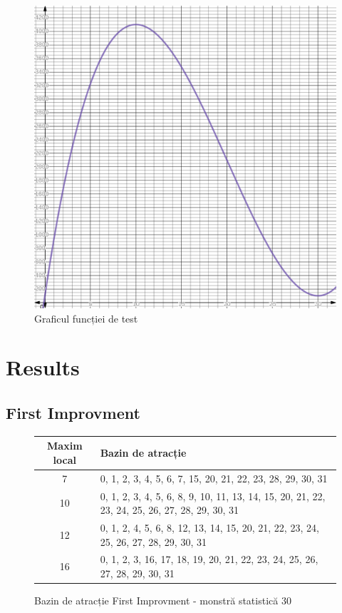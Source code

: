 \documentclass{article}
\begin{document}
\begin{figure}[!h]
  \includegraphics[width=\textwidth,height=\textheight,keepaspectratio]{desmos-graph.png}
  \caption{Graficul funcției de test}
\end{figure}

\section{Results}
\subsection{First Improvment}

\begin{figure}[!h]
\begin{tabular}{||c|||l||}
  \hline
  Maxim local & Bazin de atracție \\ \hline \hline
  7 & 0, 1, 2, 3, 4, 5, 6, 7, 15, 20, 21, 22, 23, 28, 29, 30, 31\\ \hline
  10 & 0, 1, 2, 3, 4, 5, 6, 8, 9, 10, 11, 13, 14, 15, 20, 21, 22, 23, 24, 25, 26, 27, 28, 29, 30, 31 \\ \hline
  12 & 0, 1, 2, 4, 5, 6, 8, 12, 13, 14, 15, 20, 21, 22, 23, 24, 25, 26, 27, 28, 29, 30, 31\\ \hline
  16 & 0, 1, 2, 3, 16, 17, 18, 19, 20, 21, 22, 23, 24, 25, 26, 27, 28, 29, 30, 31 \\ \hline
\end{tabular}
\caption{Bazin de atracție First Improvment - monstră statistică 30}
\end{figure}
\end{document}
